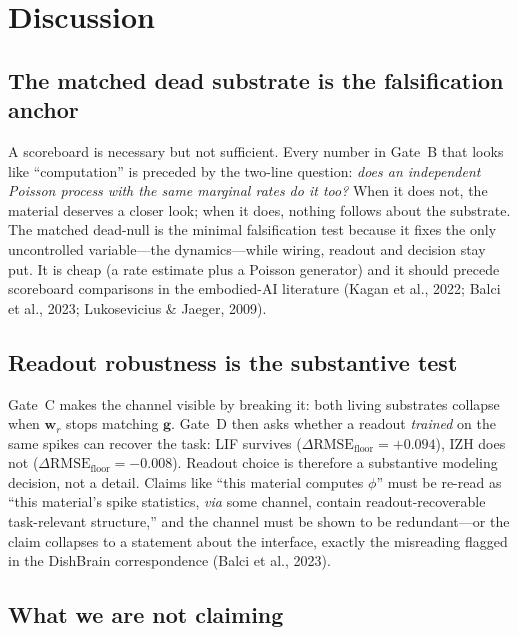 \documentclass[12pt]{article}
\begin{document}
\section{Discussion}\label{sec:discussion}

\subsection{The matched dead substrate is the falsification
anchor}\label{sec:disc1}

A scoreboard is necessary but not sufficient. Every number in
Gate~B that looks like ``computation'' is preceded by the two-line
question: \emph{does an independent Poisson process with the same
marginal rates do it too?} When it does not, the material deserves a
closer look; when it does, nothing follows about the substrate. The
matched dead-null is the minimal falsification test because it fixes
the only uncontrolled variable---the dynamics---while wiring, readout
and decision stay put. It is cheap (a rate estimate plus a Poisson
generator) and it should precede scoreboard comparisons in the
embodied-AI literature (Kagan et al., 2022; Balci et al., 2023; Lukosevicius \& Jaeger, 2009).

\subsection{Readout robustness is the substantive test}\label{sec:disc2}

Gate~C makes the channel visible by breaking it: both living
substrates collapse when $\mathbf{w}_r$ stops matching $\mathbf{g}$.
Gate~D then asks whether a readout \emph{trained} on the same spikes
can recover the task: LIF survives ($\Delta\mathrm{RMSE}_{\mathrm{floor}}=+0.094$), IZH does not
($\Delta\mathrm{RMSE}_{\mathrm{floor}}=-0.008$). Readout choice is therefore a substantive modeling
decision, not a detail. Claims like ``this material computes $\phi$''
must be re-read as ``this material's spike statistics, \emph{via} some
channel, contain readout-recoverable task-relevant structure,'' and the
channel must be shown to be redundant---or the claim collapses to a
statement about the interface, exactly the misreading flagged in the
DishBrain correspondence (Balci et al., 2023).

\subsection{What we are not claiming}\label{sec:disc3}
\end{document}
